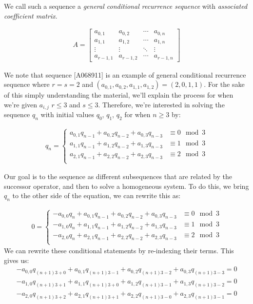 \documentclass[a4paper]{article}
\theoremstyle{definition}
\begin{document}
We call such a sequence a \textit{general conditional recurrence sequence} with \textit{associated
coefficient matrix}.

\begin{align*}
A=
\begin{bmatrix}
    a_{0,1}   & a_{0,2}   & \cdots  & a_{0,n} \\
    a_{1,1}   & a_{1,2}   & \cdots  & a_{1,n} \\
    \vdots    & \vdots    & \ddots & \vdots  \\
    a_{r-1,1} & a_{r-1,2} & \cdots  & a_{r-1,n}
\end{bmatrix}
\end{align*}

We note that sequence [A068911] is an example of general conditional recurrence sequence where $r=s=2$
and $(a_{0,1},a_{0,2},a_{1,1},a_{1,2})=(2,0,1,1)$. For the sake of this simply understanding the
material, we'll explain the process for when we're given ${a_{i,j}}$ $r \le 3$ and $s \le 3$. Therefore,
we're interested in solving the sequence $q_n$ with initial values $q_0$, $q_1$, $q_2$ for when
$n \ge 3$ by:

\begin{align*}
q_n=
\begin{cases}
a_{0,1}q_{n-1}+a_{0,2}q_{n-2}+a_{0,3}q_{n-3} & \equiv 0 \mod 3 \\
a_{1,1}q_{n-1}+a_{1,2}q_{n-2}+a_{1,3}q_{n-3} & \equiv 1 \mod 3 \\
a_{2,1}q_{n-1}+a_{2,2}q_{n-2}+a_{2,3}q_{n-3} & \equiv 2 \mod 3 \\
\end{cases}
\end{align*}

Our goal is to the sequence as different subsequences that are related by the successor operator, and
then to solve a homogeneous system. To do this, we bring $q_n$ to the other side of the equation, we can
rewrite this as:

\begin{align*}
0=
\begin{cases}
-a_{0,0}q_{n}+a_{0,1}q_{n-1}+a_{0,2}q_{n-2}+a_{0,3}q_{n-3} & \equiv 0 \mod 3 \\
-a_{1,0}q_{n}+a_{1,1}q_{n-1}+a_{1,2}q_{n-2}+a_{1,3}q_{n-3} & \equiv 1 \mod 3 \\
-a_{2,0}q_{n}+a_{2,1}q_{n-1}+a_{2,2}q_{n-2}+a_{2,3}q_{n-3} & \equiv 2 \mod 3 \\
\end{cases}
\end{align*}
We can rewrite these conditional statements by re-indexing their terms. This gives us:
\begin{align*}
-a_{0,0}q_{(n+1)3+0}+a_{0,1}q_{(n+1)3-1}
+a_{0,2}q_{(n+1)3-2}+a_{0,3}q_{(n+1)3-3} = 0 \\
-a_{1,0}q_{(n+1)3+1}+a_{1,1}q_{(n+1)3+0}
+a_{1,2}q_{(n+1)3-1}+a_{1,3}q_{(n+1)3-2} = 0 \\
-a_{2,0}q_{(n+1)3+2}+a_{2,1}q_{(n+1)3+1}
+a_{2,2}q_{(n+1)3-0}+a_{2,3}q_{(n+1)3-1} = 0
\end{align*}
\end{document}
